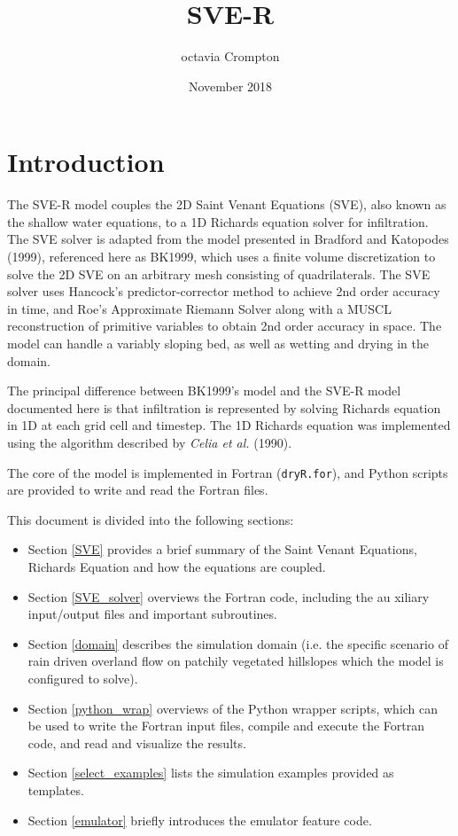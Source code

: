 \documentclass{article}
\title{SVE-R}
\author{octavia Crompton}
\date{November 2018}
\newcommand{\code}[1]{\texttt{#1}}
\begin{document}
\tableofcontents		

\section{Introduction}

The SVE-R model couples the 2D Saint Venant Equations (SVE), also known as the shallow water equations, to a 1D Richards equation solver for infiltration.  The SVE solver is adapted from the model presented in Bradford and Katopodes (1999), referenced here as BK1999, which uses a finite volume discretization to solve the 2D SVE on an arbitrary mesh consisting of quadrilaterals.   The SVE solver uses Hancock's predictor-corrector method  to achieve 2nd order accuracy in time, and Roe's Approximate Riemann Solver along with a MUSCL reconstruction of primitive variables to obtain 2nd order accuracy in space.   The model can handle a variably sloping bed, as well as wetting and drying in the domain.

The principal difference between  BK1999's model and the SVE-R model documented here is that infiltration is represented by solving Richards equation in 1D at each grid cell and timestep.  The 1D Richards equation was implemented using the algorithm described by  \textit{Celia et al.} (1990).  


The core of the model is implemented in Fortran  (\code{dryR.for}), and Python scripts are provided to write and read the Fortran files.
  
This document is divided into the following sections:

\begin{itemize}
	\item Section \ref{SVE} provides a brief summary of the Saint Venant Equations, Richards Equation and how the equations are coupled.
	\item Section \ref{SVE_solver} overviews the Fortran code, including the  au	xiliary input/output files and important subroutines.
	\item Section \ref{domain} describes the simulation domain (i.e. the specific scenario of rain driven overland flow on patchily vegetated hillslopes which the model is configured to solve).
	\item  Section \ref{python_wrap} overviews of the Python wrapper scripts,  which can be used to write the Fortran input files, compile and execute the Fortran code, and read and visualize the results.
	\item Section \ref{select_examples} lists the simulation examples provided as templates.
	\item Section \ref{emulator} briefly introduces the emulator feature code.
\end{itemize}		  
\end{document}
